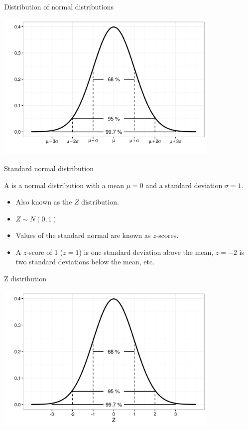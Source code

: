 \documentclass[xcolor=table, aspectratio=169, bigger, handout]{beamer}
\begin{document}
\begin{frame}{Distribution of normal distributions}

\bigskip
{\centering
\includegraphics[width=4.25in]{../images/wk06_normal}
\par}

\end{frame}

\begin{frame}{Standard normal distribution}
\begin{block}{}
A  is a normal distribution with a mean $\mu=0$ and a standard deviation $\sigma =1$. 
\begin{itemize}
\pause\item Also known as the $Z$ distribution.
\pause\item $Z \sim N(0,1)$
\pause\item Values of the standard normal are known as $z$-scores.
\pause\item A $z$-score of 1 ($z=1$) is one standard deviation above the mean, $z=-2$ is two standard deviations below the mean, etc.
\end{itemize}
\end{block}
\end{frame}

\begin{frame}{Z distribution}

\bigskip
{\centering
\includegraphics[width=4.25in]{../images/wk06_zdist}
\par}
\end{frame}
\end{document}
